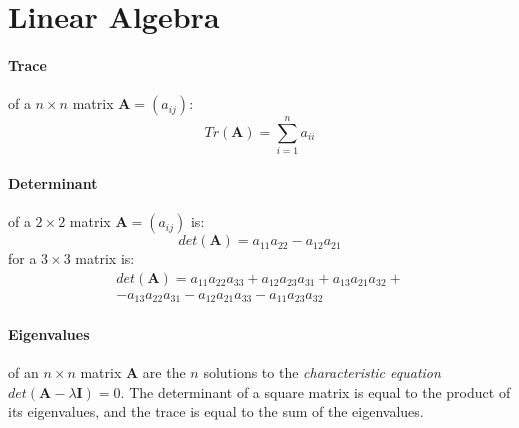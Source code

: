 \documentclass[a4paper,twocolumn]{article}
\begin{document}
\newpage

\appendix
\section{Linear Algebra}
\paragraph{Trace} of a $n \times n$ matrix $\mathbf{A} = (a_{ij})$:
\begin{equation}
	Tr(\mathbf{A}) = \sum_{i=1}^n a_{ii}
\end{equation}
\paragraph{Determinant} of a $2 \times 2$ matrix $\mathbf{A} = (a_{ij})$ is:
\begin{equation}
	det(\mathbf{A}) = a_{11} a_{22} - a_{12} a_{21}
\end{equation}
for a $3 \times 3$ matrix is:
\begin{multline*}
	det(\mathbf{A}) = a_{11} a_{22} a_{33} + a_{12} a_{23} a_{31} +
	a_{13} a_{21} a_{32} + \\ - a_{13} a_{22} a_{31} - a_{12} a_{21}
	a_{33} - a_{11} a_{23} a_{32}
\end{multline*}
\paragraph{Eigenvalues} of an $n \times n$ matrix $\mathbf{A}$ are the $n$
solutions to the \textit{characteristic equation} $det(\mathbf{A} - \lambda
\mathbf{I}) = 0$. The determinant of a square matrix is equal to the product
of its eigenvalues, and the trace is equal to the sum of the eigenvalues.
\end{document}
